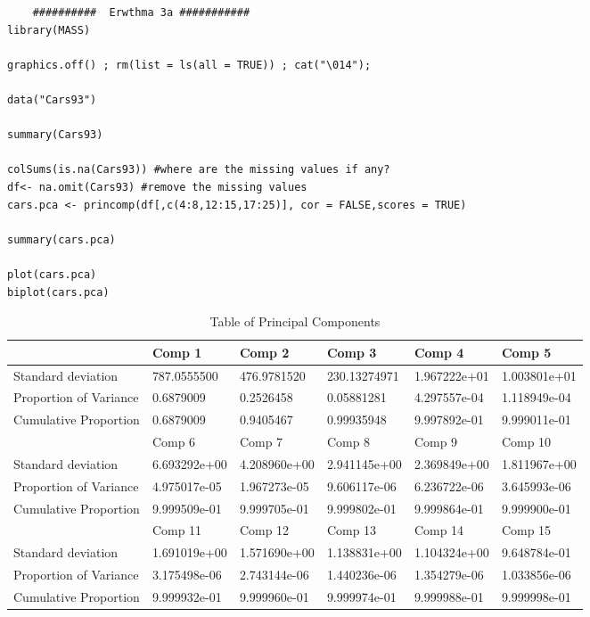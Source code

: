 \documentclass[10pt,towside,a4paper]{article}
\begin{document}
\begin{lstlisting}	
	##########  Erwthma 3a ###########
library(MASS)
	
graphics.off() ; rm(list = ls(all = TRUE)) ; cat("\014");
	
data("Cars93")
	
summary(Cars93)
	
colSums(is.na(Cars93)) #where are the missing values if any?
df<- na.omit(Cars93) #remove the missing values
cars.pca <- princomp(df[,c(4:8,12:15,17:25)], cor = FALSE,scores = TRUE)
	
summary(cars.pca)
	
plot(cars.pca)
biplot(cars.pca)
\end{lstlisting}
\begin{table}[h]
	\begin{center}
	\caption        {Table of Principal Components} \label{tab:title} 
\begin{tabular}{llllll}
	\hline
	& Comp 1       & Comp 2       & Comp 3       & Comp 4       & Comp 5       \\ \hline
	Standard deviation     & 787.0555500  & 476.9781520  & 230.13274971 & 1.967222e+01 & 1.003801e+01 \\ \hline
	Proportion of Variance & 0.6879009    & 0.2526458    & 0.05881281   & 4.297557e-04 & 1.118949e-04 \\ \hline
	Cumulative Proportion  & 0.6879009    & 0.9405467    & 0.99935948   & 9.997892e-01 & 9.999011e-01 \\ \hline
	& Comp 6       & Comp 7       & Comp 8       & Comp 9       & Comp 10      \\ \hline
	Standard deviation     & 6.693292e+00 & 4.208960e+00 & 2.941145e+00 & 2.369849e+00 & 1.811967e+00 \\ \hline
	Proportion of Variance & 4.975017e-05 & 1.967273e-05 & 9.606117e-06 & 6.236722e-06 & 3.645993e-06 \\ \hline
	Cumulative Proportion  & 9.999509e-01 & 9.999705e-01 & 9.999802e-01 & 9.999864e-01 & 9.999900e-01 \\ \hline
	& Comp 11      & Comp 12      & Comp 13      & Comp 14      & Comp  15     \\ \hline
	Standard deviation     & 1.691019e+00 & 1.571690e+00 & 1.138831e+00 & 1.104324e+00 & 9.648784e-01 \\ \hline
	Proportion of Variance & 3.175498e-06 & 2.743144e-06 & 1.440236e-06 & 1.354279e-06 & 1.033856e-06 \\ \hline
	Cumulative Proportion  & 9.999932e-01 & 9.999960e-01 & 9.999974e-01 & 9.999988e-01 & 9.999998e-01 \\ \hline

\end{tabular}
\end{center}
\end{table}
\end{document}
